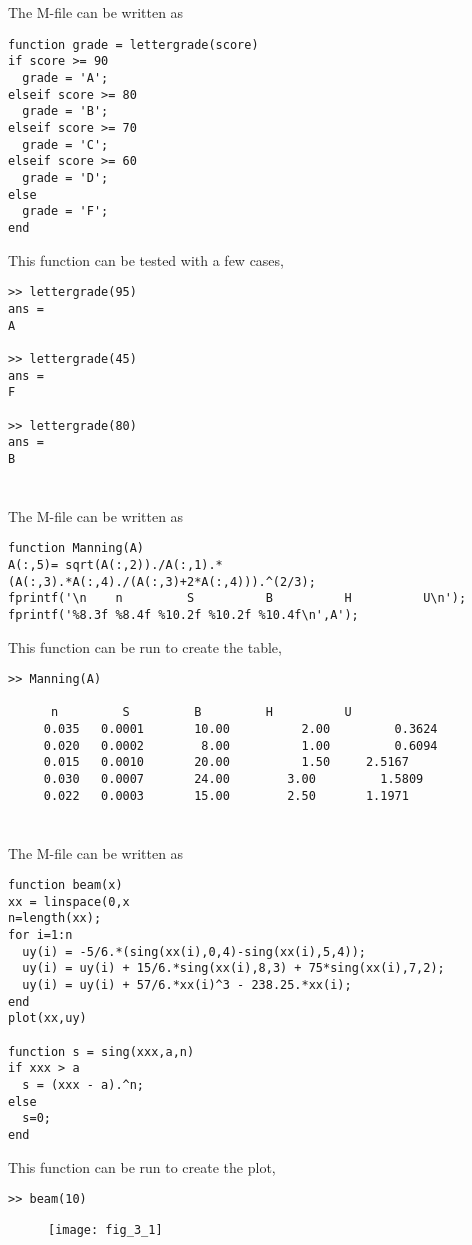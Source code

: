 \documentclass[../main.tex]{subfiles}
\begin{document}
\section{}
The M-file can be written as
\bigbreak

\begin{lstlisting}[numbers=none]
function grade = lettergrade(score)
if score >= 90
  grade = 'A';
elseif score >= 80
  grade = 'B';
elseif score >= 70
  grade = 'C';
elseif score >= 60
  grade = 'D';
else
  grade = 'F';
end 
\end{lstlisting}
\bigbreak
This function can be tested with a few cases,
\bigbreak
\begin{lstlisting}[numbers=none]
>> lettergrade(95)
ans =
A

>> lettergrade(45)
ans =
F

>> lettergrade(80)
ans =
B 
\end{lstlisting}
\bigbreak
\section{}
The M-file can be written as
\bigbreak
\begin{lstlisting}[numbers=none]
function Manning(A)
A(:,5)= sqrt(A(:,2))./A(:,1).*(A(:,3).*A(:,4)./(A(:,3)+2*A(:,4))).^(2/3);
fprintf('\n    n         S          B          H          U\n');
fprintf('%8.3f %8.4f %10.2f %10.2f %10.4f\n',A');
\end{lstlisting}
\bigbreak
This function can be run to create the table,
\bigbreak
\begin{lstlisting}[numbers=none]
>> Manning(A)

	  n         S         B         H          U             
	 0.035 	 0.0001 	  10.00 		 2.00		  0.3624
 	 0.020 	 0.0002 	   8.00 		 1.00		  0.6094
	 0.015   0.0010 	  20.00 		 1.50 	  2.5167
	 0.030   0.0007 	  24.00	 	   3.00 		1.5809
	 0.022   0.0003 	  15.00	 	   2.50		  1.1971
\end{lstlisting}
\bigbreak
\section{}
The M-file can be written as
\bigbreak
\begin{lstlisting}[numbers=none]
function beam(x)
xx = linspace(0,x
n=length(xx);
for i=1:n
  uy(i) = -5/6.*(sing(xx(i),0,4)-sing(xx(i),5,4));
  uy(i) = uy(i) + 15/6.*sing(xx(i),8,3) + 75*sing(xx(i),7,2);
  uy(i) = uy(i) + 57/6.*xx(i)^3 - 238.25.*xx(i);
end
plot(xx,uy)

function s = sing(xxx,a,n)
if xxx > a
  s = (xxx - a).^n;
else
  s=0;
end 
\end{lstlisting}
\bigbreak
This function can be run to create the plot,
\bigbreak
\begin{lstlisting}[numbers=none]
>> beam(10)
\end{lstlisting}
\bigbreak
\begin{figure}[H]
		\texttt{[image: fig\_3\_1]}
		\label{fig:fig_3_1}
	\end{figure}
\bigbreak
\end{document}
